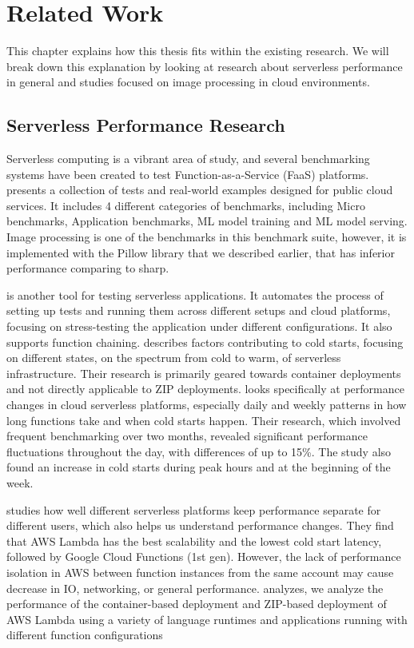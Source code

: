 \section{Related Work}
\label{cha:relatedwork}

This chapter explains how this thesis fits within the existing research. We will break down this explanation by looking at research about serverless performance in general and studies focused on image processing in cloud environments.

\subsection{Serverless Performance Research}
Serverless computing is a vibrant area of study, and several benchmarking systems have been created to test Function-as-a-Service (FaaS) platforms. \cite{kim2019functionbench} presents a collection of tests and real-world examples designed for public cloud services. It includes 4 different categories of benchmarks, including Micro benchmarks, Application benchmarks, ML model training and ML model serving. Image processing is one of the benchmarks in this benchmark suite, however, it is implemented with the Pillow library that we described earlier, that has inferior performance comparing to sharp.

\cite{somu2020panopticon} is another tool for testing serverless applications. It automates the process of setting up tests and running them across different setups and cloud platforms, focusing on stress-testing the application under different configurations. It also supports function chaining. \cite{lloyd2018serverless} describes factors contributing to cold starts, focusing on different states, on the spectrum from cold to warm, of serverless infrastructure. Their research is primarily geared towards container deployments and not directly applicable to ZIP deployments. \cite{schirmer2023night} looks specifically at performance changes in cloud serverless platforms, especially daily and weekly patterns in how long functions take and when cold starts happen. Their research, which involved frequent benchmarking over two months, revealed significant performance fluctuations throughout the day, with differences of up to 15\%. The study also found an increase in cold starts during peak hours and at the beginning of the week.

\cite{wang2018peeking} studies how well different serverless platforms keep performance separate for different users, which also helps us understand performance changes. They find that AWS Lambda has the best scalability and the lowest cold start latency, followed by Google Cloud Functions (1st gen). However, the lack of performance isolation in AWS between function instances from the same account may cause decrease in IO, networking, or general performance. \cite{dantas2022application} analyzes, we analyze the
performance of the container-based deployment and ZIP-based
deployment of AWS Lambda using a variety of language runtimes
and applications running with different function configurations

